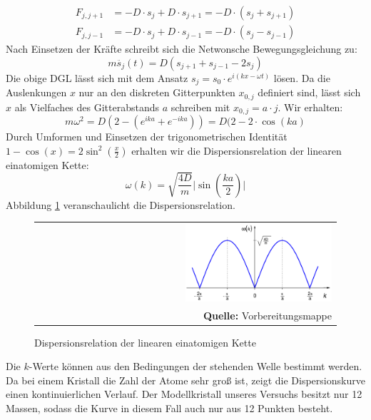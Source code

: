 \documentclass[a4paper,titlepage]{scrartcl}
\numberwithin{equation}{section}
\begin{document}
\begin{align*}
F_{j,j+1}&=-D \cdot s_j + D \cdot s_{j+1}=-D \cdot (s_j + s_{j + 1})\\
F_{j,j-1}&=-D \cdot s_j + D \cdot s_{j-1}=-D \cdot (s_j - s_{j - 1})
\end{align*}
Nach Einsetzen der Kräfte schreibt sich die Netwonsche Bewegungsgleichung zu:
\begin{equation*}
m\ddot{s_j}(t)=D(s_{j+1} + s_{j-1} - 2 s_j)
\end{equation*}
Die obige DGL lässt sich mit dem Ansatz $s_j=s_0 \cdot e^{i(kx-\omega t)}$ lösen. Da die Auslenkungen $x$ nur an den diskreten Gitterpunkten $x_{0,j}$ definiert sind, lässt sich $x$ als Vielfaches des Gitterabstands $a$ schreiben mit $x_{0,j}=a \cdot j$. Wir erhalten:
\begin{equation*}
m \omega^2=D(2-(e^{ika}+e^{-ika}))=D(2-2 \cdot \cos{(ka)}
\end{equation*}
Durch Umformen und Einsetzen der trigonometrischen Identität $1-\cos{(x)}=2\sin^2{(\frac{x}{2})}$ erhalten wir die Dispersionsrelation der linearen einatomigen Kette:
\begin{equation}
\omega(k)=\sqrt{\frac{4D}{m}}\bigg|\sin{\left(\frac{ka}{2}\right)}\bigg|
\label{eq:dispersionsrelationeinatom}
\end{equation}
Abbildung \ref{fig:einatomkettedispersion} veranschaulicht die Dispersionsrelation.
\begin{figure}[H]
	\centering
	\begin{tabular}{@{}r@{}}
		\includegraphics[width=0.5\textwidth]{images/einatomkettedispersion.png}\\
		\footnotesize\sffamily\textbf{Quelle:} Vorbereitungsmappe \cite{vorbereitungsmappe}
	\end{tabular}
	\caption{Dispersionsrelation der linearen einatomigen Kette}
    \label{fig:einatomkettedispersion}
\end{figure}
Die $k$-Werte können aus den Bedingungen der stehenden Welle bestimmt werden. Da bei einem Kristall die Zahl der Atome sehr groß ist, zeigt die Dispersionskurve einen kontinuierlichen Verlauf. Der Modellkristall unseres Versuchs besitzt nur  12 Massen, sodass die Kurve in diesem Fall auch nur aus 12 Punkten besteht.\\ \\
\end{document}
